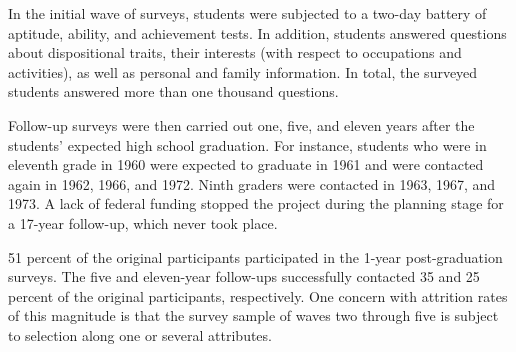 \documentclass[onehalfspacing,11pt]{article}
\begin{document}
In the initial wave of surveys, students were subjected to a two-day battery of aptitude, ability, and achievement tests. In addition, students answered questions about dispositional traits, their interests (with respect to occupations and activities), as well as personal and family information. 	In total, the surveyed students answered more than one thousand questions.

Follow-up surveys were then carried out one, five, and eleven years after the students' expected high school graduation. For instance, students who were in eleventh grade in 1960 were expected to graduate in 1961 and were contacted again in 1962, 1966, and 1972. Ninth graders were contacted in 1963, 1967, and 1973. A lack of federal funding stopped the project during the planning stage for a 17-year follow-up, which never took place.

51 percent of the original participants participated in the 1-year post-graduation surveys. The five and eleven-year follow-ups successfully contacted 35 and 25 percent of the original participants, respectively. One concern with attrition rates of this magnitude is that the survey sample of waves two through five is subject to selection along one or several attributes.
\end{document}
